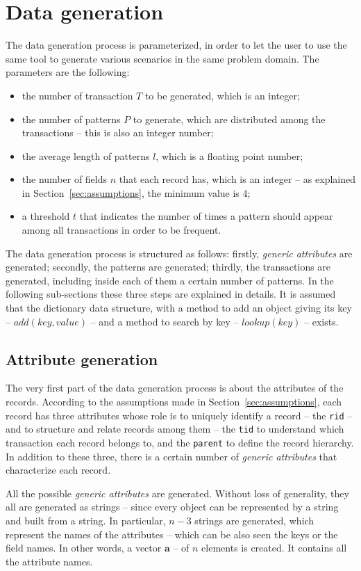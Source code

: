\documentclass{acm_proc_article-sp-sigmod09}
\begin{document}
\section{Data generation}
\label{sec:generation}
The data generation process is parameterized, in order to let the user to use the same tool to generate various scenarios in the same problem domain. The parameters are the following:
\begin{itemize}
\item the number of transaction $T$ to be generated, which is an integer;
\item the number of patterns $P$ to generate, which are distributed among the transactions -- this is also an integer number;
\item the average length of patterns $l$, which is a floating point number;
\item the number of fields $n$ that each record has, which is an integer -- as explained in Section~\ref{sec:assumptions}, the minimum value is 4;
\item a threshold $t$ that indicates the number of times a pattern should appear among all transactions in order to be frequent.
\end{itemize} 
The data generation process is structured as follows: firstly, \emph{generic attributes} are generated; secondly, the patterns are generated; thirdly, the transactions are generated, including inside each of them a certain number of patterns. In the following sub-sections these three steps are explained in details. It is assumed that the dictionary data structure, with a method to add an object giving its key -- $add(key, value)$ -- and a method to search by key -- $lookup(key)$ -- exists.

\subsection{Attribute generation}
The very first part of the data generation process is about the attributes of the records. According to the assumptions made in Section~\ref{sec:assumptions}, each record has three attributes whose role is to uniquely identify a record -- the \texttt{rid} -- and to structure and relate records among them -- the \texttt{tid} to understand which transaction each record belongs to, and the \texttt{parent} to define the record hierarchy. In addition to these three, there is a certain number of \emph{generic attributes} that characterize each record.

All the possible \emph{generic attributes} are generated. Without loss of generality, they all are generated as strings -- since every object can be represented by a string and built from a string. In particular, $n - 3$ strings are generated, which represent the names of the attributes -- which can be also seen the keys or the field names. In other words, a vector $\boldsymbol{a}$ -- of $n$ elements is created. It contains all the attribute names.
\end{document}
